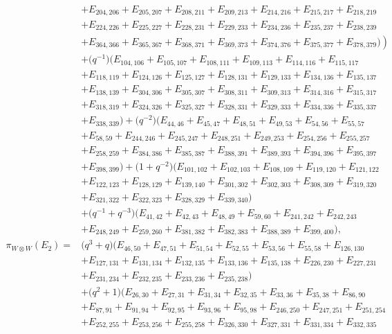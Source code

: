 \documentclass[pdftex]{sigma}
\numberwithin{equation}{section}
\theoremstyle{definition}
\begin{document}
\begin{align*}
 &+E_{204,206}+E_{205,207}+E_{208,211}+E_{209,213}+E_{214,216}+E_{215,217}+E_{218,219} \\
 &+E_{224,226}+E_{225,227}+E_{228,231}+E_{229,233}+E_{234,236}+E_{235,237}+E_{238,239} \\
 &\left.+E_{364,366}+E_{365,367}+E_{368,371}+E_{369,373}+E_{374,376}+E_{375,377}+E_{378,379})\right) \\
 &+\bigl(q^{-1}\bigr)(E_{104,106}+E_{105,107}+E_{108,111}+E_{109,113}+E_{114,116}+E_{115,117} \\
 &+E_{118,119}+E_{124,126}+E_{125,127}+E_{128,131}+E_{129,133}+E_{134,136}+E_{135,137}\\
 &+E_{138,139} +E_{304,306}+E_{305,307}+E_{308,311}+E_{309,313}+E_{314,316}+E_{315,317} \\
 &+E_{318,319}+E_{324,326}+E_{325,327}+E_{328,331}+E_{329,333}+E_{334,336}+E_{335,337} \\
 &+E_{338,339})+\bigl(q^{-2}\bigr)(E_{44,46}+E_{45,47}+E_{48,51}+E_{49,53}+E_{54,56}+E_{55,57} \\
 &+E_{58,59}+E_{244,246}+E_{245,247}+E_{248,251}+E_{249,253}+E_{254,256}+E_{255,257} \\
 &+E_{258,259}+E_{384,386}+E_{385,387}+E_{388,391}+E_{389,393}+E_{394,396}+E_{395,397} \\
 &+E_{398,399})+\bigl(1+q^{-2}\bigr)(E_{101,102}+E_{102,103}+E_{108,109}+E_{119,120}+E_{121,122} \\
 &+E_{122,123}+E_{128,129}+E_{139,140}+E_{301,302}+E_{302,303}+E_{308,309}+E_{319,320} \\
 &+E_{321,322}+E_{322,323}+E_{328,329}+E_{339,340}) \\
 &+\bigl(q^{-1}+q^{-3}\bigr)(E_{41,42}+E_{42,43}+E_{48,49}+E_{59,60}+E_{241,242}+E_{242,243} \\
 &+E_{248,249}+E_{259,260}+E_{381,382}+E_{382,383}+E_{388,389}+E_{399,400}),
\\
 \pi_{W \otimes W}(E_2) ={}&
\bigl(q^3 + q\bigr)(E_{46,50}+E_{47,51}+E_{51,54}+E_{52,55}+E_{53,56}+E_{55,58}+E_{126,130}\\
&+E_{127,131}+E_{131,134}+E_{132,135}+E_{133,136}+E_{135,138}+E_{226,230}+E_{227,231}\\
&+E_{231,234}+E_{232,235}+E_{233,236}+E_{235,238})\\
&+\bigl(q^2 + 1\bigr)(E_{26,30}+E_{27,31}+E_{31,34}+E_{32,35}+E_{33,36}+E_{35,38}+E_{86,90}\\
&+E_{87,91}+E_{91,94}+E_{92,95}+E_{93,96}+E_{95,98}+E_{246,250}+E_{247,251}+E_{251,254}\\
&+E_{252,255}+E_{253,256}+E_{255,258}+E_{326,330}+E_{327,331}+E_{331,334}+E_{332,335}\\

\end{align*}
\end{document}
